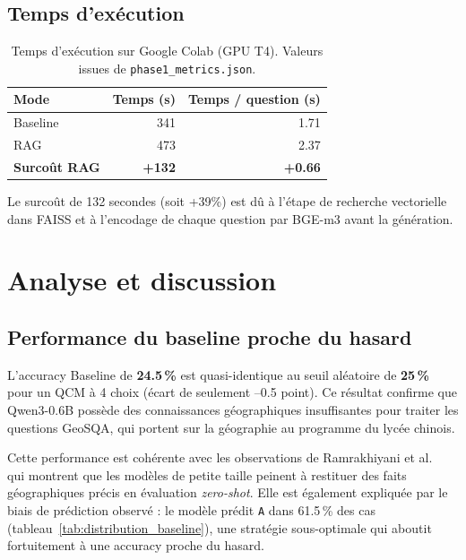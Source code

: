 \documentclass[12pt,a4paper]{article}
\begin{document}
\subsection{Temps d'exécution}

\begin{table}[H]
\centering
\caption{Temps d'exécution sur Google Colab (GPU T4). Valeurs issues de \texttt{phase1\_metrics.json}.}
\label{tab:temps}
\begin{tabular}{@{} l r r @{}}
\toprule
\textbf{Mode} & \textbf{Temps (s)} & \textbf{Temps / question (s)} \\
\midrule
Baseline & 341 & 1.71 \\
RAG & 473 & 2.37 \\
\midrule
\textbf{Surcoût RAG} & \textbf{+132} & \textbf{+0.66} \\
\bottomrule
\end{tabular}
\end{table}

Le surcoût de 132 secondes (soit +39\%) est dû à l'étape de recherche vectorielle dans FAISS et à l'encodage de chaque question par BGE-m3 avant la génération.

\section{Analyse et discussion}
\label{sec:analyse}
\subsection{Performance du baseline proche du hasard}

L'accuracy Baseline de \textbf{24.5\,\%} est quasi-identique au seuil aléatoire
de \textbf{25\,\%} pour un QCM à 4 choix (écart de seulement --0.5 point).
Ce résultat confirme que Qwen3-0.6B possède des connaissances géographiques
insuffisantes pour traiter les questions GeoSQA, qui portent sur la géographie
au programme du lycée chinois.

Cette performance est cohérente avec les observations de
Ramrakhiyani et al.~\cite{ramrakhiyani_zero-shot_2023} qui montrent que les
modèles de petite taille peinent à restituer des faits géographiques précis en
évaluation \textit{zero-shot}. Elle est également expliquée par le biais de
prédiction observé : le modèle prédit \texttt{A} dans 61.5\,\% des cas
(tableau~\ref{tab:distribution_baseline}), une stratégie sous-optimale qui
aboutit fortuitement à une accuracy proche du hasard.
\end{document}
